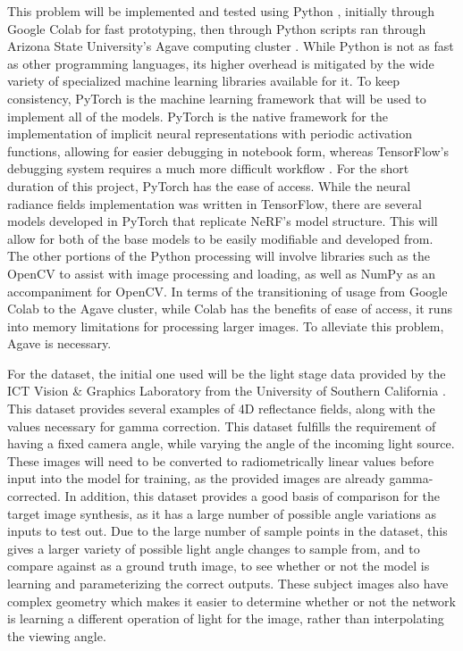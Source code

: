 \documentclass[12pt,twoside]{article}
\begin{document}
	This problem will be implemented and tested using Python \cite{python}, initially through Google Colab for fast prototyping, then through Python scripts ran through Arizona State University's Agave computing cluster \cite{agave}. While Python is not as fast as other programming languages, its higher overhead is mitigated by the wide variety of specialized machine learning libraries available for it. To keep consistency, PyTorch is the machine learning framework that will be used to implement all of the models. PyTorch is the native framework for the implementation of implicit neural representations with periodic activation functions, allowing for easier debugging in notebook form, whereas TensorFlow's debugging system requires a much more difficult workflow \cite{tensorflow}. For the short duration of this project, PyTorch has the ease of access. While the neural radiance fields implementation was written in TensorFlow, there are several models developed in PyTorch that replicate NeRF's model structure. This will allow for both of the base models to be easily modifiable and developed from. The other portions of the Python processing will involve libraries such as the OpenCV \cite{opencv} to assist with image processing and loading, as well as NumPy\cite{numpy} as an accompaniment for OpenCV. In terms of the transitioning of usage from Google Colab to the Agave cluster, while Colab has the benefits of ease of access, it runs into memory limitations for processing larger images. To alleviate this problem, Agave is necessary.
	
	For the dataset, the initial one used will be the light stage data provided by the ICT Vision \& Graphics Laboratory from the University of Southern California \cite{lightstage}. This dataset provides several examples of 4D reflectance fields, along with the values necessary for gamma correction. This dataset fulfills the requirement of having a fixed camera angle, while varying the angle of the incoming light source. These images will need to be converted to radiometrically linear values before input into the model for training, as the provided images are already gamma-corrected. In addition, this dataset provides a good basis of comparison for the target image synthesis, as it has a large number of possible angle variations as inputs to test out. Due to the large number of sample points in the dataset, this gives a larger variety of possible light angle changes to sample from, and to compare against as a ground truth image, to see whether or not the model is learning and parameterizing the correct outputs. These subject images also have complex geometry which makes it easier to determine whether or not the network is learning a different operation of light for the image, rather than interpolating the viewing angle. 
	
\end{document}

